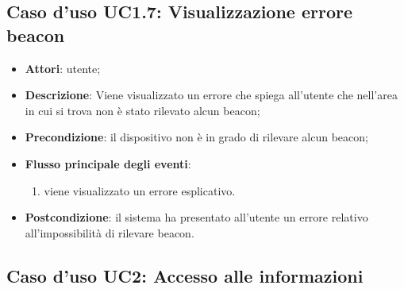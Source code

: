 \documentclass[../AnalisiDeiRequisiti.tex]{subfiles}
\begin{document}
\subsection{Caso d'uso UC1.7: Visualizzazione errore beacon}
\begin{itemize}
	\item \textbf{Attori}: utente;
	\item \textbf{Descrizione}: Viene visualizzato un errore che spiega all'utente che nell'area in cui si trova non è stato rilevato alcun beacon; 
	\item \textbf{Precondizione}: il dispositivo non è in grado di rilevare alcun beacon;
	
	\item \textbf{Flusso principale degli eventi}:
	\begin{enumerate}
		\item viene visualizzato un errore esplicativo.
		
	\end{enumerate}
	\item \textbf{Postcondizione}: il sistema ha presentato all'utente un errore relativo all'impossibilità di rilevare beacon.
\end{itemize}
\hypertarget{UC2}{}
\subsection{Caso d'uso UC2: Accesso alle informazioni}
\end{document}

